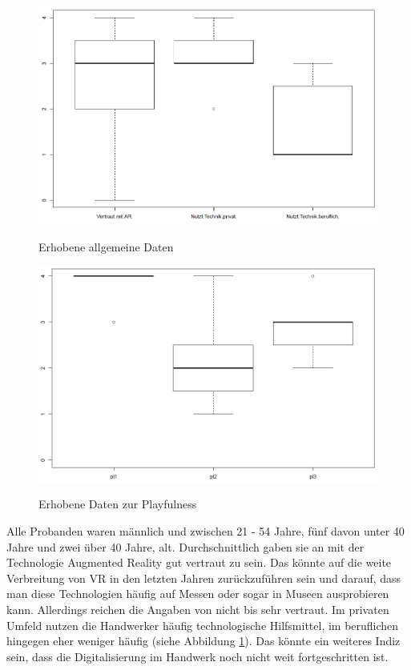 \begin{figure}[h]
	\begin{center}
		\includegraphics[scale=0.5]{Resources/Evaluation/allgemein.png}
		\label{allgemein}
		\caption{Erhobene allgemeine Daten}	
	\end{center}
\end{figure}

\begin{figure}[h]
	\begin{center}
		\includegraphics[scale=0.5]{Resources/Evaluation/playful.png}
		\label{playful}
		\caption{Erhobene Daten zur Playfulness}	
	\end{center}
\end{figure}

Alle Probanden waren männlich und zwischen 21 - 54 Jahre, fünf davon unter 40 Jahre und zwei über 40 Jahre, alt. Durchschnittlich gaben sie an mit der Technologie Augmented Reality gut vertraut zu sein. Das könnte auf die weite Verbreitung von VR in den letzten Jahren zurückzuführen sein und darauf, dass man diese Technologien häufig auf Messen oder sogar in Museen ausprobieren kann. Allerdings reichen die Angaben von nicht bis sehr vertraut. Im privaten Umfeld nutzen die Handwerker häufig technologische Hilfsmittel, im beruflichen hingegen eher weniger häufig (siehe Abbildung \ref{allgemein}). Das könnte ein weiteres Indiz sein, dass die Digitalisierung im Handwerk noch nicht weit fortgeschritten ist.

